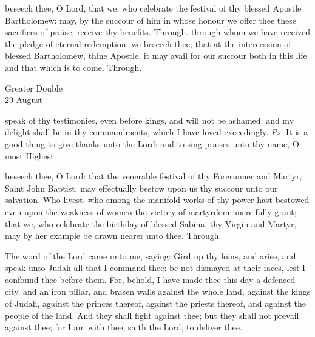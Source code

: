 \secret
{} beseech thee, O Lord, that we, who celebrate the festival of thy blessed Apostle Bartholomew: may, by the succour of him in whose honour we offer thee these sacrifices of praise, receive thy benefits. Through.
\postcommunion
{} through whom we have received the pledge of eternal redemption: we beseech thee; that at the intercession of blessed Bartholomew, thine Apostle, it may avail for our succour both in this life and that which is to come. Through.

\begin{inhead}
    {Greater Double\\
29 August}
\end{inhead}

\introit
{} speak of thy testimonies, even before kings, and will not be ashamed: and my delight shall be in thy commandments, which I have loved exceedingly. \textit{Ps.} It is a good thing to give thanks unto the Lord: and to sing praises unto thy name, O most Highest.

\collect
{} beseech thee, O Lord: that the venerable festival of thy Forerunner and Martyr, Saint John Baptist, may effectually bestow upon us thy succour unto our salvation. Who livest.
 who among the manifold works of thy power hast bestowed even upon the weakness of women the victory of martyrdom: mercifully grant; that we, who celebrate the birthday of blessed Sabina, thy Virgin and Martyr, may by her example be drawn nearer unto thee. Through.

 The word of the Lord came unto me, saying: Gird up thy loins, and arise, and speak unto Judah all that I command thee: be not dismayed at their faces, lest I confound thee before them. For, behold, I have made thee this day a defenced city, and an iron pillar, and brasen walls against the whole land, against the kings of Judah, against the princes thereof, against the priests thereof, and against the people of the land. And they shall fight against thee; but they shall not prevail against thee; for I am with thee, saith the Lord, to deliver thee.



